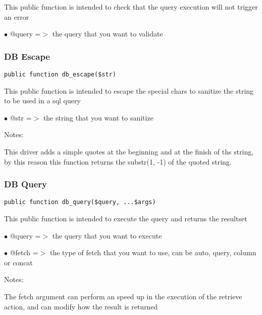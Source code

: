 \documentclass[a4paper]{article}
\begin{document}
This public function is intended to check that the query execution will not trigger an error

\begin{compactitem}
\item[\color{myblue}$\bullet$] @query =$>$ the query that you want to validate
\end{compactitem}

\hypertarget{toc340}{}
\subsubsection{DB Escape}

\begin{lstlisting}
public function db_escape($str)
\end{lstlisting}

This public function is intended to escape the special chars to sanitize the string to be used
in a sql query

\begin{compactitem}
\item[\color{myblue}$\bullet$] @str =$>$ the string that you want to sanitize
\end{compactitem}

Notes:

This driver adds a simple quotes at the beginning and at the finish of ths string, by this
reason this function returns the substr(1, -1) of the quoted string.

\hypertarget{toc341}{}
\subsubsection{DB Query}

\begin{lstlisting}
public function db_query($query, ...$args)
\end{lstlisting}

This public function is intended to execute the query and returns the resultset

\begin{compactitem}
\item[\color{myblue}$\bullet$] @query =$>$ the query that you want to execute
\item[\color{myblue}$\bullet$] @fetch =$>$ the type of fetch that you want to use, can be auto, query, column or concat
\end{compactitem}

Notes:

The fetch argument can perform an speed up in the execution of the retrieve action, and
can modify how the result is returned
\end{document}
